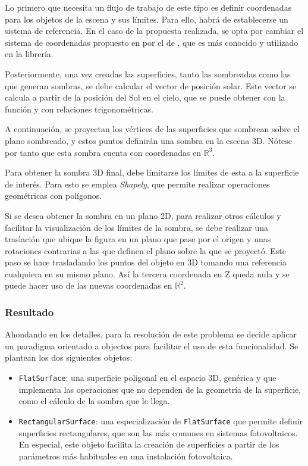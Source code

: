 Lo primero que necesita un flujo de trabajo de este tipo es definir coordenadas para los objetos de la escena y sus límites. Para ello, habrá de establecerse un sistema de referencia. En el caso de la propuesta realizada, se opta por cambiar el sistema de coordenadas propuesto en \cite{Zainali_Ma_Lu_Stridh_Avelin_Amaducci_Colauzzi_Campana_2023} por el de \cite{Anderson_Mikofski_2020}, que es más conocido y utilizado en la librería.

Posteriormente, una vez creadas las superficies, tanto las sombreadas como las que generan sombras, se debe calcular el vector de posición solar. Este vector se calcula a partir de la posición del Sol en el cielo, que se puede obtener con la función  y con relaciones trigonométricas.

A continuación, se proyectan los vértices de las superficies que sombrean sobre el plano sombreado, y estos puntos definirán una \gls{sombra} en la escena 3D. Nótese por tanto que esta \gls{sombra} cuenta con coordenadas en $\mathbb{R}^3$.

Para obtener la \gls{sombra} 3D final, debe limitarse los límites de esta a la superficie de interés. Para esto se emplea \textit{Shapely}, que permite realizar operaciones geométricas con polígonos.

Si se desea obtener la \gls{sombra} en un plano 2D, para realizar otros cálculos y facilitar la visualización de los límites de la \gls{sombra}, se debe realizar una traslación que ubique la figura en un plano que pase por el origen y unas rotaciones contrarias a las que definen el plano sobre la que se proyectó. Este paso se hace trasladando los puntos del objeto en 3D tomando una referencia cualquiera en su mismo plano. Así la tercera coordenada en Z queda nula y se puede hacer uso de las nuevas coordenadas en $\mathbb{R}^2$.

\subsubsection{Resultado}

Ahondando en los detalles, para la resolución de este problema se decide aplicar un paradigma orientado a objectos para facilitar el uso de esta funcionalidad. Se plantean los dos siguientes objetos:

\begin{itemize}
    \item \texttt{FlatSurface}: una superficie poligonal en el espacio 3D, genérica y que implementa las operaciones que no dependen de la geometría de la superficie, como el cálculo de la \gls{sombra} que le llega.
    \item \texttt{RectangularSurface}: una especialización de \texttt{FlatSurface} que permite definir superficies rectangulares, que son las más comunes en sistemas fotovoltaicos. En especial, este objeto facilita la creación de superficies a partir de los parámetros más habituales en una instalación fotovoltaica.
\end{itemize}

